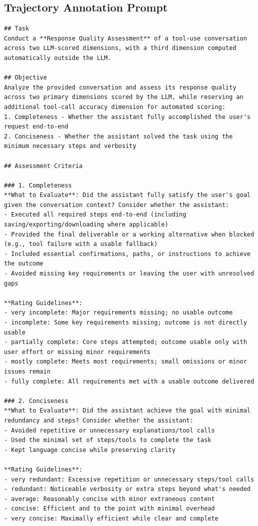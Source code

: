 \subsection{Trajectory Annotation Prompt}
\label{app:trajectory-annotation-prompt-for-single-server}
\begin{verbatim}
## Task
Conduct a **Response Quality Assessment** of a tool-use conversation across two LLM-scored dimensions, with a third dimension computed automatically outside the LLM.

## Objective
Analyze the provided conversation and assess its response quality across two primary dimensions scored by the LLM, while reserving an additional tool-call accuracy dimension for automated scoring:
1. Completeness - Whether the assistant fully accomplished the user's request end-to-end
2. Conciseness - Whether the assistant solved the task using the minimum necessary steps and verbosity

## Assessment Criteria

### 1. Completeness
**What to Evaluate**: Did the assistant fully satisfy the user's goal given the conversation context? Consider whether the assistant:
- Executed all required steps end-to-end (including saving/exporting/downloading where applicable)
- Provided the final deliverable or a working alternative when blocked (e.g., tool failure with a usable fallback)
- Included essential confirmations, paths, or instructions to achieve the outcome
- Avoided missing key requirements or leaving the user with unresolved gaps

**Rating Guidelines**:
- very incomplete: Major requirements missing; no usable outcome
- incomplete: Some key requirements missing; outcome is not directly usable
- partially complete: Core steps attempted; outcome usable only with user effort or missing minor requirements
- mostly complete: Meets most requirements; small omissions or minor issues remain
- fully complete: All requirements met with a usable outcome delivered

### 2. Conciseness
**What to Evaluate**: Did the assistant achieve the goal with minimal redundancy and steps? Consider whether the assistant:
- Avoided repetitive or unnecessary explanations/tool calls
- Used the minimal set of steps/tools to complete the task
- Kept language concise while preserving clarity

**Rating Guidelines**:
- very redundant: Excessive repetition or unnecessary steps/tool calls
- redundant: Noticeable verbosity or extra steps beyond what's needed
- average: Reasonably concise with minor extraneous content
- concise: Efficient and to the point with minimal overhead
- very concise: Maximally efficient while clear and complete


\end{verbatim}
